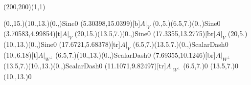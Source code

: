 \unitlength=1bp%

\begin{feynartspicture}(200,200)(1,1)

\FADiagram{}
\FAProp(0.,15.)(10.,13.)(0.,){Sine}{0}
\FALabel(5.30398,15.0399)[b]{$A|_V$}
\FAProp(0.,5.)(6.5,7.)(0.,){Sine}{0}
\FALabel(3.70583,4.99854)[t]{$A|_V$}
\FAProp(20,15.)(13.5,7.)(0.,){Sine}{0}
\FALabel(17.3355,13.2775)[br]{$A|_V$}
\FAProp(20,5.)(10.,13.)(0.,){Sine}{0}
\FALabel(17.6721,5.68378)[tr]{$A|_V$}
\FAProp(6.5,7.)(13.5,7.)(0.,){ScalarDash}{0}
\FALabel(10.,6.18)[t]{$A|_{W^\perp}$}
\FAProp(6.5,7.)(10.,13.)(0.,){ScalarDash}{0}
\FALabel(7.69355,10.1246)[br]{$A|_{W^\perp}$}
\FAProp(13.5,7.)(10.,13.)(0.,){ScalarDash}{0}
\FALabel(11.1071,9.82497)[tr]{$A|_{W^\perp}$}
\FAVert(6.5,7.){0}
\FAVert(13.5,7.){0}
\FAVert(10.,13.){0}
\end{feynartspicture}

